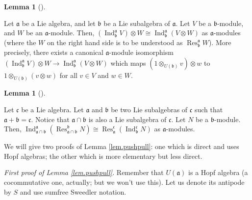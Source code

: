 \documentclass
[numbers=enddot,12pt,final,onecolumn,german,notitlepage]{scrartcl}%
\theoremstyle{definition}
\newtheorem{lem}[theo]{Lemma}
\newenvironment{lemma}[1][]
{\begin{lem}[#1]\begin{leftbar}}
{\end{leftbar}\end{lem}}
\begin{document}
\begin{lemma}
\label{lem.pushpull}Let $\mathfrak{a}$ be a Lie algebra, and let
$\mathfrak{b}$ be a Lie subalgebra of $\mathfrak{a}$. Let $V$ be a
$\mathfrak{b}$-module, and $W$ be an $\mathfrak{a}$-module. Then, $\left(
\operatorname*{Ind}\nolimits_{\mathfrak{b}}^{\mathfrak{a}}V\right)  \otimes
W\cong\operatorname*{Ind}\nolimits_{\mathfrak{b}}^{\mathfrak{a}}\left(
V\otimes W\right)  $ as $\mathfrak{a}$-modules (where the $W$ on the right
hand side is to be understood as $\operatorname*{Res}\nolimits_{\mathfrak{b}%
}^{\mathfrak{a}}W$). More precisely, there exists a canonical $\mathfrak{a}%
$-module isomorphism $\left(  \operatorname*{Ind}\nolimits_{\mathfrak{b}%
}^{\mathfrak{a}}V\right)  \otimes W\rightarrow\operatorname*{Ind}%
\nolimits_{\mathfrak{b}}^{\mathfrak{a}}\left(  V\otimes W\right)  $ which maps
$\left(  1\otimes_{U\left(  \mathfrak{b}\right)  }v\right)  \otimes w$ to
$1\otimes_{U\left(  \mathfrak{b}\right)  }\left(  v\otimes w\right)  $ for all
$v\in V$ and $w\in W$.
\end{lemma}

\begin{lemma}
\label{lem.IndRes}Let $\mathfrak{c}$ be a Lie algebra. Let $\mathfrak{a}$ and
$\mathfrak{b}$ be two Lie subalgebras of $\mathfrak{c}$ such that
$\mathfrak{a}+\mathfrak{b}=\mathfrak{c}$. Notice that $\mathfrak{a}%
\cap\mathfrak{b}$ is also a Lie subalgebra of $\mathfrak{c}$. Let $N$ be a
$\mathfrak{b}$-module. Then, $\operatorname*{Ind}\nolimits_{\mathfrak{a}%
\cap\mathfrak{b}}^{\mathfrak{a}}\left(  \operatorname*{Res}%
\nolimits_{\mathfrak{a}\cap\mathfrak{b}}^{\mathfrak{b}}N\right)
\cong\operatorname*{Res}\nolimits_{\mathfrak{a}}^{\mathfrak{c}}\left(
\operatorname*{Ind}\nolimits_{\mathfrak{b}}^{\mathfrak{c}}N\right)  $ as
$\mathfrak{a}$-modules.
\end{lemma}

We will give two proofs of Lemma \ref{lem.pushpull}: one which is direct and
uses Hopf algebras; the other which is more elementary but less direct.

\textit{First proof of Lemma \ref{lem.pushpull}.} Remember that $U\left(
\mathfrak{a}\right)  $ is a Hopf algebra (a cocommutative one, actually; but
we won't use this). Let us denote its antipode by $S$ and use sumfree Sweedler notation.
\end{document}

